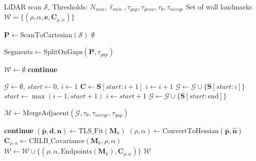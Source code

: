 \documentclass[11pt]{article}
\begin{document}
\begin{algorithm}[htbp]
	\caption{Wall Landmark Extraction from 2D LiDAR Scan}
	\label{alg:wall_extraction_full}
	\begin{algorithmic}[1]
		\renewcommand{\algorithmicrequire}{\textbf{Input:}}
		\renewcommand{\algorithmicensure}{\textbf{Output:}}
		\Require LiDAR scan $\mathcal{S}$, Thresholds: $N_{min}, \ell_{min}, \tau_{gap}, \tau_{grow}, \tau_{\theta}, \tau_{merge}$
		\Ensure Set of wall landmarks $\mathcal{W} = \{(\rho, \alpha, \mathbf{e}, \mathbf{C}_{\rho,\alpha})\}$
		
		\State $\mathbf{P} \gets \text{ScanToCartesian}(\mathcal{S})$
		\State \Return $\emptyset$ 
		\EndIf
		
		\State $\text{Segments} \gets \text{SplitOnGaps}(\mathbf{P}, \tau_{gap})$ 
		
		\State $\mathcal{W} \gets \emptyset$
		\State \textbf{continue} 
		\EndIf
		
		\State {}
		\State $\mathcal{G} \gets \emptyset$, $start \gets 0$, $i \gets 1$
		\State $\mathbf{C} \gets \mathbf{S}[start : i+1]$
		\State $i \gets i + 1$
		\Else
		\State $\mathcal{G} \gets \mathcal{G} \cup \{\mathbf{S}[start : i]\}$ 
		\EndIf
		\State $start \gets \max(i-1, start+1)$ 
		\State $i \gets start + 1$
		\EndIf
		\EndWhile
		\State $\mathcal{G} \gets \mathcal{G} \cup \{\mathbf{S}[start : \text{end}]\}$ 
		\EndIf
		
		\State {}
		\State $\mathcal{M} \gets \text{MergeAdjacent}(\mathcal{G}, \tau_{\theta}, \tau_{merge}, \tau_{gap})$
		
		\State {}
		\State \textbf{continue} 
		\EndIf
		\State $(\bar{\mathbf{p}}, \mathbf{d}, \hat{\mathbf{n}}) \gets \text{TLS\_Fit}(\mathbf{M}_k)$ 
		\State $(\rho, \alpha) \gets \text{ConvertToHessian}(\bar{\mathbf{p}}, \hat{\mathbf{n}})$
		\State $\mathbf{C}_{\rho,\alpha} \gets \text{CRLB\_Covariance}(\mathbf{M}_k, \rho, \alpha)$ 
		\State $\mathcal{W} \gets \mathcal{W} \cup \{(\rho, \alpha, \text{Endpoints}(\mathbf{M}_k), \mathbf{C}_{\rho,\alpha})\}$
		\EndFor
		\EndFor
		\State \Return $\mathcal{W}$
	\end{algorithmic}
\end{algorithm}
\end{document}
